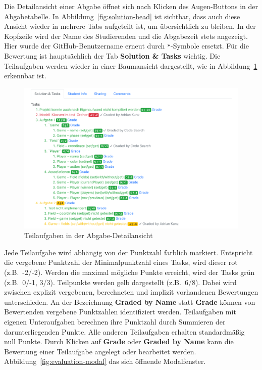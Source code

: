 Die Detailansicht einer Abgabe öffnet sich nach Klicken des Augen-Buttons in der Abgabetabelle.
In Abbildung~\ref{fig:solution-head} ist sichtbar, dass auch diese Ansicht wieder in mehrere Tabs aufgeteilt ist, um übersichtlich zu bleiben.
In der Kopfzeile wird der Name des Studierenden und die Abgabezeit stets angezeigt.
Hier wurde der GitHub-Benutzername erneut durch \texttt{*}-Symbole ersetzt.
Für die Bewertung ist hauptsächlich der Tab \textbf{Solution \& Tasks} wichtig.
Die Teilaufgaben werden wieder in einer Baumansicht dargestellt, wie in Abbildung~\ref{fig:solution-tasks} erkennbar ist.

\begin{figure}
    \centering
    \includegraphics[width=\textwidth]{images/solution-tasks}
    \caption{Teilaufgaben in der Abgabe-Detailansicht}
    \label{fig:solution-tasks}
\end{figure}

Jede Teilaufgabe wird abhängig von der Punktzahl farblich markiert.
Entspricht die vergebene Punktzahl der Minimalpunktzahl eines Tasks, wird dieser rot (z.B.\ -2/-2).
Werden die maximal mögliche Punkte erreicht, wird der Tasks grün (z.B.\ 0/-1, 3/3).
Teilpunkte werden gelb dargestellt (z.B.\ 6/8).
Dabei wird zwischen explizit vergebenen, berechneten und implizit vorhandenen Bewertungen unterschieden.
An der Bezeichnung \textbf{Graded by Name} statt \textbf{Grade} können von Bewertenden vergebene Punktzahlen identifiziert werden.
Teilaufgaben mit eigenen Unteraufgaben berechnen ihre Punktzahl durch Summieren der darunterliegenden Punkte.
Alle anderen Teilaufgaben erhalten standardmäßig null Punkte.
Durch Klicken auf \textbf{Grade} oder \textbf{Graded by Name} kann die Bewertung einer Teilaufgabe angelegt oder bearbeitet werden.
Abbildung~\ref{fig:evaluation-modal} das sich öffnende Modalfenster.

